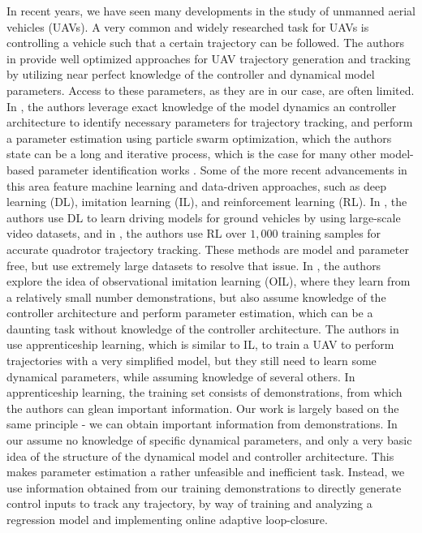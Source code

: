 \documentclass[letterpaper, 10 pt, conference]{ieeeconf}  %
\begin{document}
In recent years, we have seen many developments in the study of unmanned aerial vehicles (UAVs). A very common and widely researched task for UAVs is controlling a vehicle such that a certain trajectory can be followed. The authors in \cite{minsnap,waypt,tvec} provide well optimized approaches for UAV trajectory generation and tracking by utilizing near perfect knowledge of the controller and dynamical model parameters. Access to these parameters, as they are in our case, are often limited. In \cite{modelparams}, the authors leverage exact knowledge of the model dynamics an controller architecture to identify necessary parameters for trajectory tracking, and perform a parameter estimation using particle swarm optimization, which the authors state can be a long and iterative process, which is the case for many other model-based parameter identification works \cite{modelbased1,modelbased2}.
Some of the more recent advancements in this area feature machine learning and data-driven approaches, such as deep learning (DL), imitation learning (IL), and reinforcement learning (RL). In \cite{dln}, the authors use DL to learn driving models for ground vehicles by using large-scale video datasets, and in \cite{rlctrl}, the authors use RL  over $1,000$ training samples for accurate quadrotor trajectory tracking. These methods are model and parameter free, but use extremely large datasets to resolve that issue. In \cite{uavrace}, the authors explore the idea of observational imitation learning (OIL), where they learn from a relatively small number demonstrations, but also assume knowledge of the controller architecture and perform parameter estimation, which can be a daunting task without knowledge of the controller architecture. The authors in \cite{abbeel} use apprenticeship learning, which is similar to IL, to train a UAV to perform trajectories with a very simplified model, but they still need to learn some dynamical parameters, while assuming knowledge of several others. In apprenticeship learning, the training set consists of demonstrations, from which the authors can glean important information.
Our work is largely based on the same principle - we can obtain important information from demonstrations. In our assume no knowledge of specific dynamical parameters, and only a very basic idea of the structure of the dynamical model and controller architecture. This makes parameter estimation a rather unfeasible and inefficient task. Instead, we use information obtained from our training demonstrations to directly generate control inputs to track any trajectory, by way of training and analyzing a regression model and implementing online adaptive loop-closure.
\end{document}
